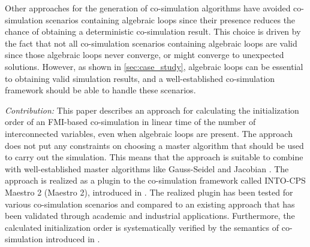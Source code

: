 Other approaches for the generation of co-simulation algorithms have avoided co-simulation scenarios containing algebraic loops since their presence reduces the chance of obtaining a deterministic co-simulation result\cite{Amalio2016CheckingCo-simulation, BromanCompositionCo-Simulation, Gomes2019c}. This choice is driven by the fact that not all co-simulation scenarios containing algebraic loops are valid since those algebraic loops never converge, or might converge to unexpected solutions. However, as shown in \cref{sec:case_study}, algebraic loops can be essential to obtaining valid simulation results, and a well-established co-simulation framework should be able to handle these scenarios. 

\textit{Contribution:} This paper describes an approach for calculating the initialization order of an FMI-based co-simulation in linear time of the number of interconnected variables, even when algebraic loops are present.
The approach does not put any constraints on choosing a master algorithm that should be used to carry out the simulation. 
This means that the approach is suitable to combine with well-established master algorithms like Gauss-Seidel and Jacobian \cite{Palensky2017}. 
The approach is realized as a plugin to the co-simulation framework called INTO-CPS Maestro 2 (Maestro 2), introduced in \cite{Thule2019b}.
The realized plugin has been tested for various co-simulation scenarios and compared to an existing approach that has been validated through academic and industrial applications. 
Furthermore, the calculated initialization order is systematically verified by the semantics of co-simulation introduced in \cite{gomes_lucio_vangheluwe_2019,Gomes2019c}. \\

